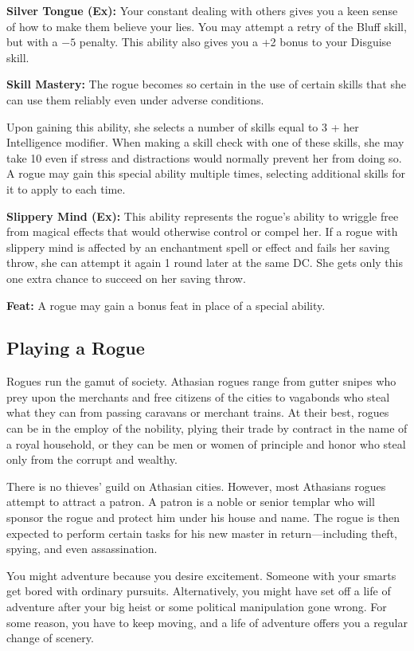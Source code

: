 \textbf{Silver Tongue (Ex):} Your constant dealing with others gives you a keen sense of how to make them believe your lies. You may attempt a retry of the Bluff skill, but with a $-5$ penalty. This ability also gives you a +2 bonus to your Disguise skill.

\textbf{Skill Mastery:} The rogue becomes so certain in the use of certain skills that she can use them reliably even under adverse conditions.

Upon gaining this ability, she selects a number of skills equal to 3 + her Intelligence modifier. When making a skill check with one of these skills, she may take 10 even if stress and distractions would normally prevent her from doing so. A rogue may gain this special ability multiple times, selecting additional skills for it to apply to each time.

\textbf{Slippery Mind (Ex):} This ability represents the rogue’s ability to wriggle free from magical effects that would otherwise control or compel her. If a rogue with slippery mind is affected by an enchantment spell or effect and fails her saving throw, she can attempt it again 1 round later at the same DC. She gets only this one extra chance to succeed on her saving throw.

\textbf{Feat:} A rogue may gain a bonus feat in place of a special ability.

\subsection{Playing a Rogue}

Rogues run the gamut of society. Athasian rogues range from gutter snipes who prey upon the merchants and free citizens of the cities to vagabonds who steal what they can from passing caravans or merchant trains. At their best, rogues can be in the employ of the nobility, plying their trade by contract in the name of a royal household, or they can be men or women of principle and honor who steal only from the corrupt and wealthy.

There is no thieves’ guild on Athasian cities. However, most Athasians rogues attempt to attract a patron. A patron is a noble or senior templar who will sponsor the rogue and protect him under his house and name. The rogue is then expected to perform certain tasks for his new master in return—including theft, spying, and even assassination.

You might adventure because you desire excitement. Someone with your smarts get bored with ordinary pursuits. Alternatively, you might have set off a life of adventure after your big heist or some political manipulation gone wrong. For some reason, you have to keep moving, and a life of adventure offers you a regular change of scenery.

